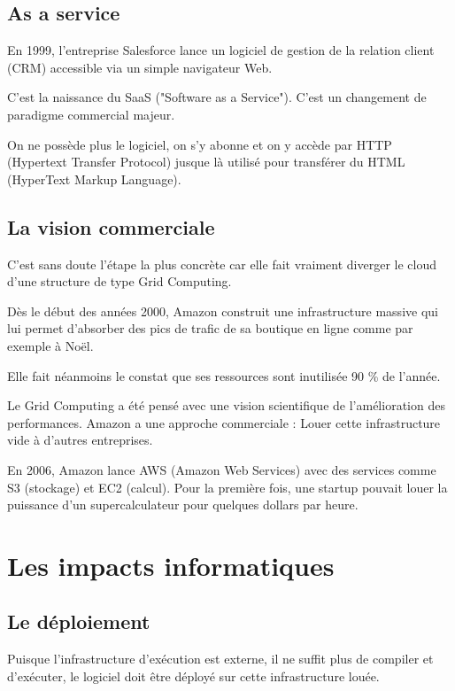 \documentclass{report} %
\begin{document}
\subsection{As a service}

En 1999, l'entreprise Salesforce lance un logiciel de gestion de la
relation client (CRM) accessible via un simple navigateur Web.

C'est la naissance du SaaS ("Software as a Service"). C'est un
changement de paradigme commercial majeur.

On ne possède plus le logiciel, on s'y abonne et on y accède par HTTP
(Hypertext Transfer Protocol) jusque là utilisé pour transférer du
HTML (HyperText Markup Language).

\subsection{La vision commerciale}

C'est sans doute l'étape la plus concrète car elle fait vraiment
diverger le cloud d'une structure de type Grid Computing.

Dès le début des années 2000, Amazon construit une infrastructure
massive qui lui permet d'absorber des pics de trafic de sa
boutique en ligne comme par exemple à Noël.

Elle fait néanmoins le constat que ses ressources sont inutilisée 90
\% de l'année.

Le Grid Computing a été pensé avec une vision scientifique de
l'amélioration des performances. Amazon a une approche commerciale :
Louer cette infrastructure vide à d'autres entreprises.

En 2006, Amazon lance AWS (Amazon Web Services) avec des services
comme S3 (stockage) et EC2 (calcul).  Pour la première fois, une
startup pouvait louer la puissance d'un supercalculateur pour quelques
dollars par heure.


\section{Les impacts informatiques}

\subsection{Le déploiement}

Puisque l'infrastructure d'exécution est externe, il ne suffit plus de
compiler et d'exécuter, le logiciel doit être déployé sur cette infrastructure louée.
\end{document}
